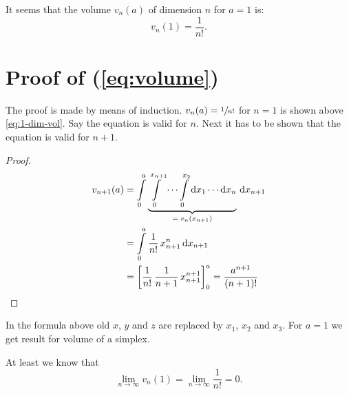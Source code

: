 \documentclass[11pt,paper=a4,oneside,ngerman,english,parskip=half]{scrartcl}
\begin{document}
It seems that the volume $v_n(a)$ of dimension $n$ for $a = 1$ is:
\begin{equation}
\label{eq:volume}
v_n(1) = \frac{1}{n!}.
\end{equation}


\section{Proof of (\ref{eq:volume})}
The proof is made by means of induction.
$v_n(a) = \sfrac{1}{n!}$ for $n = 1$ is shown above \eqref{eq:1-dim-vol}. Say the equation is valid for $n$. Next it has to be shown that the equation is valid for $n+1$.
\begin{proof}
\begin{align}
v_{n+1}(a) &= \int\limits_{0}^{a} \underbrace{\int\limits_{0}^{x_{n+1}} \cdots \int\limits_{0}^{x_2} \text{d}x_1 \cdots \text{d}x_n}_{=\;v_n(x_{n+1})}  \,\text{d}x_{n+1} \\
 &= \int\limits_{0}^{a} \frac{1}{n!} \, x_{n+1}^n \,\text{d}x_{n+1} \\
 &= \left[\frac{1}{n!}\,\frac{1}{n+1}\,x_{n+1}^{n+1} \right]_0^{a} = \frac{a^{n+1}}{(n+1)!} \qedhere
\end{align}
\end{proof}

In the formula above old $x$, $y$ and $z$ are replaced by $x_1$, $x_2$ and $x_3$. For $a = 1$ we get result for volume of a simplex.

At least we know that
\begin{equation}
\lim\limits_{n\rightarrow \infty}v_n(1) = \lim\limits_{n\rightarrow \infty} \frac{1}{n!} = 0.
\end{equation}






%





\printbibliography[title=Weiterführende Literatur]
\end{document}
